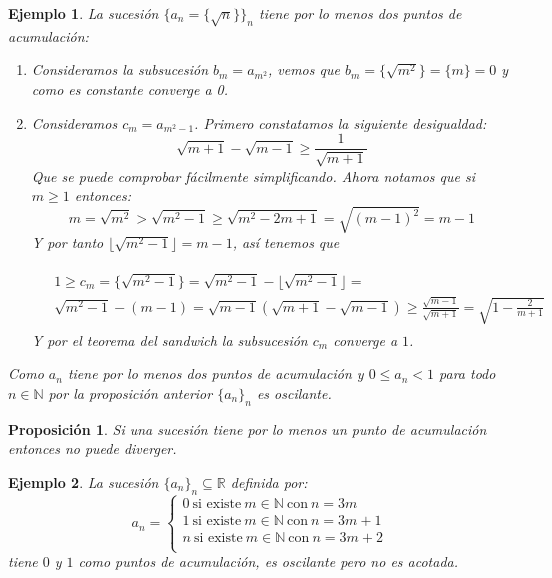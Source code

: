 \documentclass{article}
\newtheorem{prop}{Proposición}
\newtheorem{ejem}{Ejemplo}
\newcommand{\reales}{\mathbb{R}}
\newcommand{\naturales}{\mathbb{N}}
\newcommand{\sucesion}[1]{\{ #1 _n \}_n}
\newcommand{\sucreal}[1]{\{ #1 _n \}_n \subseteq \reales}
\begin{document}
\begin{ejem}
	La sucesión $\{ a_n = \{\sqrt{n}\} \}_n$ tiene por lo menos dos puntos de acumulación:
	\begin{enumerate}
		\item
		Consideramos la subsucesión $b_m = a_{m^2}$, vemos que $b_m = \{\sqrt{m^2} \} = \{m \} = 0$ y como es constante converge a 0.
		\item
		Consideramos $c_m = a_{m^2 - 1}$. Primero constatamos la siguiente desigualdad:
		\begin{equation}
			\sqrt{m+1} - \sqrt{m-1} \geq \frac{1}{\sqrt{m+1}}
		\end{equation}				
		Que se puede comprobar fácilmente simplificando. Ahora notamos que si $m \geq 1$ entonces:
		\begin{equation*}
			m = \sqrt{m^2} > \sqrt{m^2 - 1} \geq \sqrt{m^2 - 2m + 1} = \sqrt{(m-1)^2} = m - 1
		\end{equation*}
		Y por tanto $\lfloor \sqrt{m^2 - 1} \rfloor = m - 1$, así tenemos que 
		
		\begin{align*}
			\begin{split}
				& 1 \geq c_m = \{\sqrt{m^2 - 1} \} = \sqrt{m^2 - 1} - \lfloor \sqrt{m^2 - 1} \rfloor =\\ & \sqrt{m^2 - 1} - (m - 1) = \sqrt{m-1}(\sqrt{m+1} - \sqrt{m-1})
				\geq  \frac{\sqrt{m-1}}{\sqrt{m+1}} = \sqrt{1 - \frac{2}{m+1}}
			\end{split}
		\end{align*}
		Y por el teorema del sandwich la subsucesión $c_m$ converge a $1$.\
	\end{enumerate}
	Como $a_n$ tiene por lo menos dos puntos de acumulación y $0 \leq a_n < 1$ para todo $n \in \naturales$ por la proposición anterior $\sucesion{a}$ es oscilante.
\end{ejem}

\begin{prop}
	Si una sucesión tiene por lo menos un punto de acumulación entonces no puede diverger.
\end{prop}

\begin{ejem}
	La sucesión $\sucreal{a}$ definida por:
	\begin{equation}
		a_n = \left\lbrace
		\begin{array}{l}
		0\ \text{si existe}\ m \in \naturales\ \text{con}\ n = 3m\\
		1\ \text{si existe}\ m \in \naturales\ \text{con}\ n = 3m + 1\\
		n\ \text{si existe}\ m \in \naturales\ \text{con}\ n = 3m + 2\\
		\end{array}
		\right.
	\end{equation}
	tiene $0$ y $1$ como puntos de acumulación, es oscilante pero no es acotada.
\end{ejem}
\end{document}

